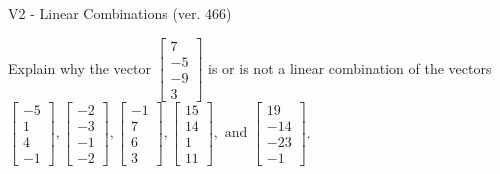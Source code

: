 \begin{exercise}
  \begin{exerciseTitle}V2 - Linear Combinations (ver. 466)\end{exerciseTitle}
  \begin{exerciseStatement}
    Explain why the vector \(\left[\begin{array}{c}
7 \\
-5 \\
-9 \\
3
\end{array}\right]\)  is or is not a linear 
	combination of the vectors \(\left[\begin{array}{c}
-5 \\
1 \\
4 \\
-1
\end{array}\right] , \left[\begin{array}{c}
-2 \\
-3 \\
-1 \\
-2
\end{array}\right] , \left[\begin{array}{c}
-1 \\
7 \\
6 \\
3
\end{array}\right] , \left[\begin{array}{c}
15 \\
14 \\
1 \\
11
\end{array}\right] , \text{ and } \left[\begin{array}{c}
19 \\
-14 \\
-23 \\
-1
\end{array}\right]\).
	



\end{exerciseStatement}
\end{exercise}
